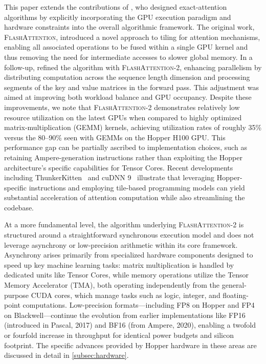 This paper extends the contributions of \citet{dao2022flashattention}, who designed exact-attention algorithms by explicitly incorporating the GPU execution paradigm and hardware constraints into the overall algorithmic framework. The original work, \textsc{FlashAttention}, introduced a novel approach to tiling for attention mechanisms, enabling all associated operations to be fused within a single GPU kernel and thus removing the need for intermediate accesses to slower global memory. In a follow-up, \citet{dao2023flashattention2} refined the algorithm with \textsc{FlashAttention-2}, enhancing parallelism by distributing computation across the sequence length dimension and processing segments of the key and value matrices in the forward pass. This adjustment was aimed at improving both workload balance and GPU occupancy. Despite these improvements, we note that \textsc{FlashAttention-2} demonstrates relatively low resource utilization on the latest GPUs when compared to highly optimized matrix-multiplication (GEMM) kernels, achieving utilization rates of roughly 35\% versus the 80–90\% seen with GEMMs on the Hopper H100 GPU. This performance gap can be partially ascribed to implementation choices, such as retaining Ampere-generation instructions rather than exploiting the Hopper architecture’s specific capabilities for Tensor Cores. Recent developments including ThunkerKitten~\citep{spector2024thunder} and cuDNN 9~\citep{cudnn9} illustrate that leveraging Hopper-specific instructions and employing tile-based programming models can yield substantial acceleration of attention computation while also streamlining the codebase.

At a more fundamental level, the algorithm underlying \textsc{FlashAttention-2} is structured around a straightforward synchronous execution model and does not leverage asynchrony or low-precision arithmetic within its core framework. Asynchrony arises primarily from specialized hardware components designed to speed up key machine learning tasks: matrix multiplication is handled by dedicated units like Tensor Cores, while memory operations utilize the Tensor Memory Accelerator (TMA), both operating independently from the general-purpose CUDA cores, which manage tasks such as logic, integer, and floating-point computations. Low-precision formats—including FP8 on Hopper and FP4 on Blackwell—continue the evolution from earlier implementations like FP16 (introduced in Pascal, 2017) and BF16 (from Ampere, 2020), enabling a twofold or fourfold increase in throughput for identical power budgets and silicon footprint. The specific advances provided by Hopper hardware in these areas are discussed in detail in \cref{subsec:hardware}. 

